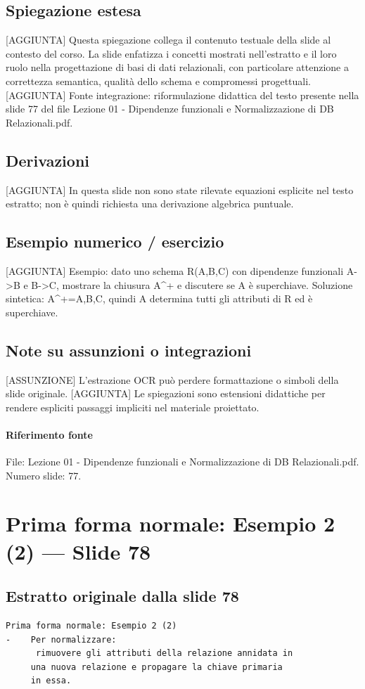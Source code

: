 \documentclass[11pt]{article}
\begin{document}
\subsection*{Spiegazione estesa}
[AGGIUNTA] Questa spiegazione collega il contenuto testuale della slide al contesto del corso. La slide enfatizza i concetti mostrati nell'estratto e il loro ruolo nella progettazione di basi di dati relazionali, con particolare attenzione a correttezza semantica, qualità dello schema e compromessi progettuali.
[AGGIUNTA] Fonte integrazione: riformulazione didattica del testo presente nella slide 77 del file Lezione 01 - Dipendenze funzionali e Normalizzazione di DB Relazionali.pdf.
\subsection*{Derivazioni}
[AGGIUNTA] In questa slide non sono state rilevate equazioni esplicite nel testo estratto; non è quindi richiesta una derivazione algebrica puntuale.
\subsection*{Esempio numerico / esercizio}
[AGGIUNTA] Esempio: dato uno schema R(A,B,C) con dipendenze funzionali A->B e B->C, mostrare la chiusura A^+ e discutere se A è superchiave. Soluzione sintetica: A^+={A,B,C}, quindi A determina tutti gli attributi di R ed è superchiave.
\subsection*{Note su assunzioni o integrazioni}
[ASSUNZIONE] L'estrazione OCR può perdere formattazione o simboli della slide originale.
[AGGIUNTA] Le spiegazioni sono estensioni didattiche per rendere espliciti passaggi impliciti nel materiale proiettato.
\paragraph{Riferimento fonte} File: Lezione 01 - Dipendenze funzionali e Normalizzazione di DB Relazionali.pdf. Numero slide: 77.
\section{Prima forma normale: Esempio 2 (2) --- Slide 78}
\subsection*{Estratto originale dalla slide 78}
\begin{lstlisting}
Prima forma normale: Esempio 2 (2)
-    Per normalizzare:
      rimuovere gli attributi della relazione annidata in
     una nuova relazione e propagare la chiave primaria
     in essa.
\end{lstlisting}
\end{document}
